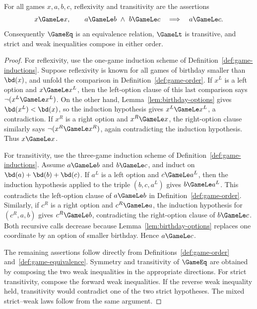\begin{theorem}
  \label{thm:game-order-calculus}
  \leanok
  For all games \(x,a,b,c\), reflexivity and transitivity are the assertions
  \[
    x\GameLe x,
    \qquad
    a\GameLe b\ \wedge\ b\GameLe c
      \quad\Longrightarrow\quad a\GameLe c.
  \]
  Consequently \(\GameEq\) is an equivalence relation, \(\GameLt\) is transitive, and strict
  and weak inequalities compose in either order.
\end{theorem}
\begin{proof}
  \leanok
  For reflexivity, use the one-game induction scheme of
  Definition~\ref{def:game-inductions}.  Suppose reflexivity is known for all
  games of birthday smaller than \(\bd(x)\), and unfold the comparison in
  Definition~\ref{def:game-order}.  If \(x^L\) is a left option and
  \(x\GameLe x^L\), then the left-option clause of this last comparison says
  \(\neg(x^L\GameLe x^L)\).  On the other hand,
  Lemma~\ref{lem:birthday-options} gives \(\bd(x^L)<\bd(x)\), so the induction
  hypothesis gives \(x^L\GameLe x^L\), a contradiction.  If \(x^R\) is a
  right option and \(x^R\GameLe x\), the right-option clause similarly says
  \(\neg(x^R\GameLe x^R)\), again contradicting the induction hypothesis.
  Thus \(x\GameLe x\).

  For transitivity, use the three-game induction scheme of
  Definition~\ref{def:game-inductions}.  Assume \(a\GameLe b\) and
  \(b\GameLe c\), and induct on
  \(\bd(a)+\bd(b)+\bd(c)\).  If \(a^L\) is a left option and
  \(c\GameLe a^L\), then the induction hypothesis applied to the triple
  \((b,c,a^L)\) gives \(b\GameLe a^L\).  This contradicts the left-option
  clause of \(a\GameLe b\) in Definition~\ref{def:game-order}.  Similarly, if
  \(c^R\) is a right option and \(c^R\GameLe a\), the induction hypothesis for
  \((c^R,a,b)\) gives \(c^R\GameLe b\), contradicting the right-option clause
  of \(b\GameLe c\).  Both recursive calls decrease because
  Lemma~\ref{lem:birthday-options} replaces one coordinate by an option of
  smaller birthday.  Hence \(a\GameLe c\).

  The remaining assertions follow directly from
  Definitions~\ref{def:game-order} and~\ref{def:game-equivalence}.  Symmetry and transitivity
  of \(\GameEq\)
  are obtained by composing the two weak inequalities in the appropriate
  directions.  For strict transitivity, compose the forward weak inequalities.
  If the reverse weak inequality held, transitivity would contradict one of
  the two strict hypotheses.  The mixed strict--weak laws follow from the same
  argument.
\end{proof}


